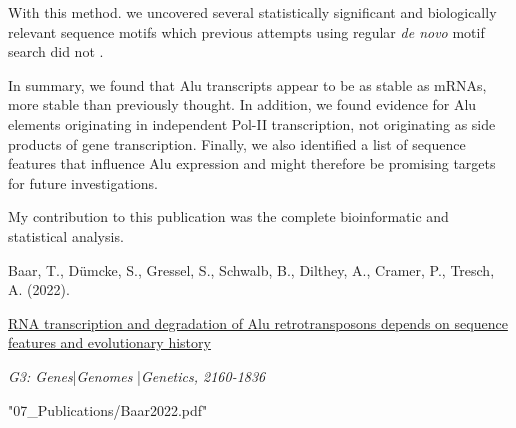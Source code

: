 With this method. we uncovered several statistically significant and
biologically relevant sequence motifs which previous attempts using regular
\textit{de novo} motif search did not \citep{Zhang2019}.
\bigbreak

\noindent In summary, we found that Alu transcripts appear to be as stable as
mRNAs, more stable than previously thought. In addition, we found evidence for
Alu elements originating in independent Pol-II transcription, not originating
as side products of gene transcription. Finally, we also identified a list of
sequence features that influence Alu expression and might therefore be
promising targets for future investigations.
\pagebreak


\null
\vfill
\noindent My contribution to this publication was the complete bioinformatic
and statistical analysis.\nopagebreak
\medskip
\begin{tcolorbox}[
  boxrule=0pt, leftrule=1pt, colframe=s-blue, colback=white, sharp corners=all]%
  \raggedright
  Baar, T., Dümcke, S., Gressel, S., Schwalb, B.,
  Dilthey, A., Cramer, P., Tresch, A. (2022).
  
  \smallskip
  \href{https://doi.org/10.1093/g3journal/jkac054}
    {RNA transcription and degradation of Alu retrotransposons depends on
    sequence features and evolutionary history}

  \smallskip
  \textit{G3: Genes}\thinspace{}|\thinspace{}\textit{Genomes}%
    \thinspace{}|\thinspace{}\textit{Genetics, 2160-1836}
\end{tcolorbox}



  {"07_Publications/Baar2022.pdf"}


\null
\thispagestyle{empty}
\newpage